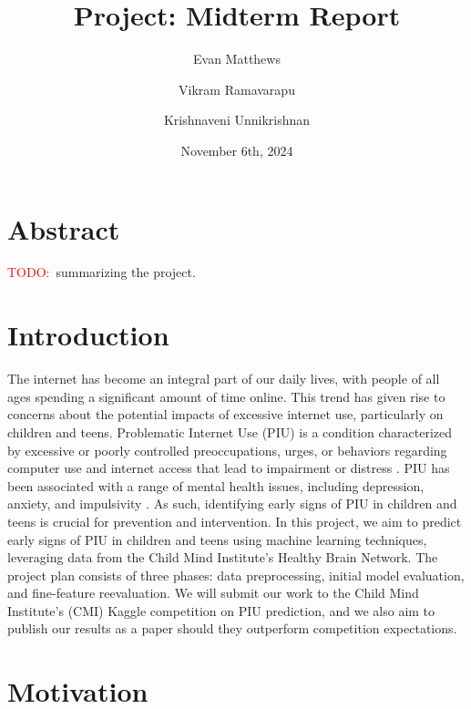 \documentclass[11pt]{extarticle}
\title{Project: Midterm Report}
\author[1]{Evan Matthews}
\author[1]{Vikram Ramavarapu}
\author[1]{Krishnaveni Unnikrishnan}
\affil[1]{CS 412 Group G6}
\date{November 6th, 2024}
\newcommand{\todo}{\textcolor{red}{TODO:}~}
\begin{document}
\maketitle

\pagebreak


\section{Abstract}
\todo summarizing the project\cite{Pettorruso2020-qt,Cash2012-rb,Aboujaoude2010-mc,Restrepo2020-pb}.

\begin{mdframed}
\end{mdframed}

\section{Introduction}

The internet has become an integral part of our daily lives, with people of all ages spending a significant amount of time online. 
This trend has given rise to concerns about the potential impacts of excessive internet use, particularly on children and teens.
Problematic Internet Use (PIU) is a condition characterized by excessive or poorly controlled preoccupations, urges, or behaviors regarding computer use and internet access that lead to impairment or distress \cite{Pettorruso2020-qt}. 
PIU has been associated with a range of mental health issues, including depression, anxiety, and impulsivity \cite{Cash2012-rb}.
As such, identifying early signs of PIU in children and teens is crucial for prevention and intervention.
In this project, we aim to predict early signs of PIU in children and teens using machine learning techniques, leveraging data from the Child Mind Institute's Healthy Brain Network.
The project plan consists of three phases: data preprocessing, initial model evaluation, and fine-feature reevaluation.
We will submit our work to the Child Mind Institute's (CMI) Kaggle competition on PIU prediction, and we also aim to publish our results as a paper should they outperform competition expectations.


\section{Motivation} 
\end{document}
